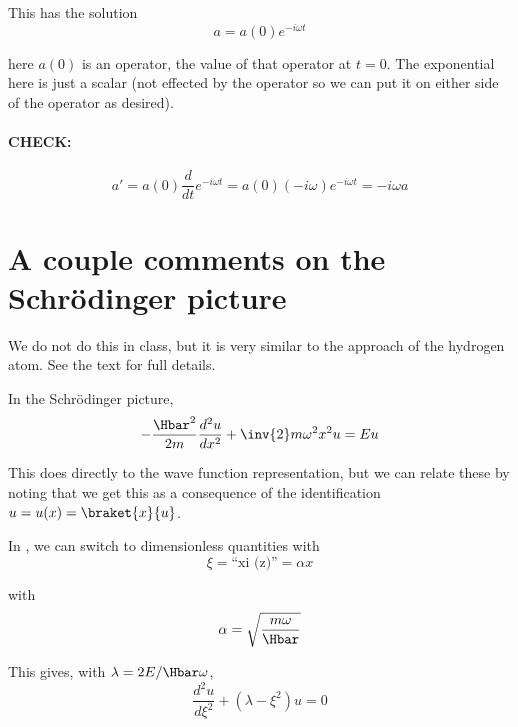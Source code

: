 This has the solution
\begin{equation}\label{eqn:PHY356FLecture11:290}
a = a(0) e^{-i \omega t}
\end{equation}

here \(a(0)\) is an operator, the value of that operator at \(t = 0\).  The exponential here is just a scalar (not effected by the operator so we can put it on either side of the operator as desired).

\paragraph{CHECK:}
\begin{equation}\label{eqn:PHY356FLecture11:291}
a' = a(0) \frac{d}{dt} e^{-i \omega t} = a(0) (-i \omega) e^{-i \omega t} = -i \omega a
\end{equation}

\section{A couple comments on the Schr\"{o}dinger picture}

We do not do this in class, but it is very similar to the approach of the hydrogen atom.  See the text for full details.

In the Schr\"{o}dinger picture,
\begin{equation}\label{eqn:PHY356FLecture11:400}
-\frac{\Hbar^2}{2m} \frac{d^2 u}{dx^2} + \inv{2} m \omega^2 x^2 u = E u
\end{equation}

This does directly to the wave function representation, but we can relate these by noting that we get this as a consequence of the identification \(u = u(x) = \braket{x}{u}\).

In , we can switch to dimensionless quantities with
\begin{equation}\label{eqn:PHY356FLecture11:410}
\xi = \text{``xi (z)''} = \alpha x
\end{equation}

with
\begin{equation}\label{eqn:PHY356FLecture11:411}
\alpha = \sqrt{\frac{m \omega}{\Hbar}}
\end{equation}

This gives, with \(\lambda = 2E/\Hbar\omega\),
%
\begin{equation}\label{eqn:PHY356FLecture11:420}
\frac{d^2 u}{d\xi^2} + (\lambda - \xi^2) u = 0
\end{equation}

